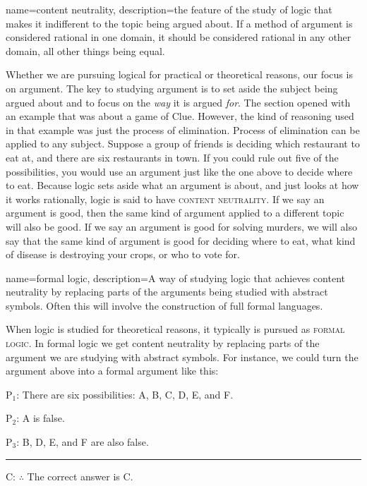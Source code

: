 {
name=content neutrality,
description={the feature of the study of logic that makes it indifferent to the topic being argued about. If a method of argument is considered rational in one domain, it should be considered rational in any other domain, all other things being equal.}
}

Whether we are pursuing logical for practical or theoretical reasons, our focus is on argument. The key to studying argument is to set aside the subject being argued about and to focus on the \emph{way} it is argued \emph{for}. The section opened with an example that was about a game of Clue. However, the kind of reasoning used in that example was just the process of elimination. Process of elimination can be applied to any subject. Suppose a group of friends is deciding which restaurant to eat at, and there are six restaurants in town. If you could rule out five of the possibilities, you would use an argument just like the one above to decide where to eat. Because logic sets aside what an argument is about, and just looks at how it works rationally, logic is said to have \textsc{\gls{content neutrality}}. \label{def:content_neutrality} If we say an argument is good, then the same kind of argument applied to a different topic will also be good.  If we say an argument is good for solving murders, we will also say that the same kind of argument is good for deciding where to eat, what kind of disease is destroying your crops, or who to vote for. 

{
name=formal logic,
description={A way of studying logic that achieves content neutrality by replacing parts of the arguments being studied with abstract symbols. Often this will involve the construction of full formal languages.}
}


When logic is studied for theoretical reasons, it typically is pursued as \textsc{\gls{formal logic}}. \label{def:Formal_logic} In formal logic we get content neutrality by replacing parts of the argument we are studying with abstract symbols. For instance, we could turn the argument above into a formal argument like this:

\label{argClueformal}
\begin{earg}
\item[P$_1$:] There are six possibilities: A, B, C, D, E, and F.
\item[P$_2$:] A is false.
\item[P$_3$:] B, D, E, and F are also false.
\vspace{-.5em}
\item [] \rule{0.6\linewidth}{.5pt} 
\item[C:]  $\therefore$ The correct answer is C.
\end{earg} 

